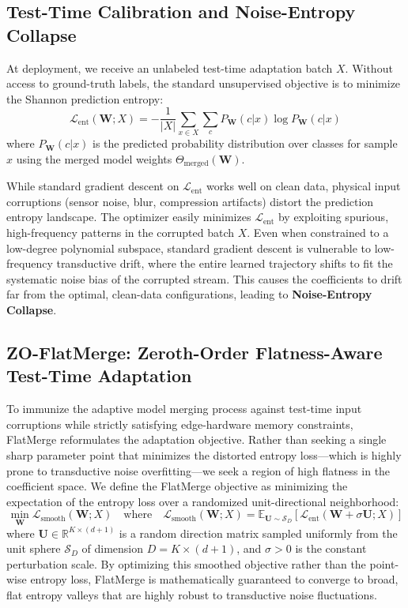 \subsection{Test-Time Calibration and Noise-Entropy Collapse}
At deployment, we receive an unlabeled test-time adaptation batch $X$. 
Without access to ground-truth labels, the standard unsupervised objective is to minimize the Shannon prediction entropy:
\begin{equation}
    \mathcal{L}_{\text{ent}}(\mathbf{W}; X) = -\frac{1}{|X|} \sum_{x \in X} \sum_{c} P_{\mathbf{W}}(c|x) \log P_{\mathbf{W}}(c|x)
\end{equation}
where $P_{\mathbf{W}}(c|x)$ is the predicted probability distribution over classes for sample $x$ using the merged model weights $\Theta_{\text{merged}}(\mathbf{W})$.

While standard gradient descent on $\mathcal{L}_{\text{ent}}$ works well on clean data, physical input corruptions (sensor noise, blur, compression artifacts) distort the prediction entropy landscape. 
The optimizer easily minimizes $\mathcal{L}_{\text{ent}}$ by exploiting spurious, high-frequency patterns in the corrupted batch $X$. 
Even when constrained to a low-degree polynomial subspace, standard gradient descent is vulnerable to low-frequency transductive drift, where the entire learned trajectory shifts to fit the systematic noise bias of the corrupted stream. 
This causes the coefficients to drift far from the optimal, clean-data configurations, leading to \textbf{Noise-Entropy Collapse}.

\subsection{ZO-FlatMerge: Zeroth-Order Flatness-Aware Test-Time Adaptation}
To immunize the adaptive model merging process against test-time input corruptions while strictly satisfying edge-hardware memory constraints, FlatMerge reformulates the adaptation objective. 
Rather than seeking a single sharp parameter point that minimizes the distorted entropy loss—which is highly prone to transductive noise overfitting—we seek a region of high flatness in the coefficient space. 
We define the FlatMerge objective as minimizing the expectation of the entropy loss over a randomized unit-directional neighborhood:
\begin{equation}
    \min_{\mathbf{W}} \mathcal{L}_{\text{smooth}}(\mathbf{W}; X) \quad \text{where} \quad \mathcal{L}_{\text{smooth}}(\mathbf{W}; X) = \mathbb{E}_{\mathbf{U} \sim \mathcal{S}_D} [\mathcal{L}_{\text{ent}}(\mathbf{W} + \sigma \mathbf{U}; X)]
\end{equation}
where $\mathbf{U} \in \mathbb{R}^{K \times (d+1)}$ is a random direction matrix sampled uniformly from the unit sphere $\mathcal{S}_D$ of dimension $D = K \times (d+1)$, and $\sigma > 0$ is the constant perturbation scale. By optimizing this smoothed objective rather than the point-wise entropy loss, FlatMerge is mathematically guaranteed to converge to broad, flat entropy valleys that are highly robust to transductive noise fluctuations.

